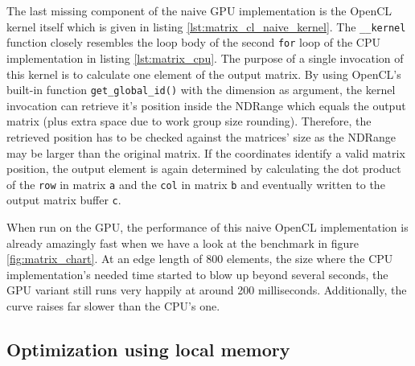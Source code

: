 

The last missing component of the naive GPU implementation is the OpenCL kernel itself which is given in listing \ref{lst:matrix_cl_naive_kernel}. The \lstinline!__kernel! function closely resembles the loop body of the second \lstinline!for! loop of the CPU implementation in listing \ref{lst:matrix_cpu}. The purpose of a single invocation of this kernel is to calculate one element of the output matrix. By using OpenCL's built-in function \lstinline!get_global_id()! with the dimension as argument, the kernel invocation can retrieve it's position inside the NDRange which equals the output matrix (plus extra space due to work group size rounding). Therefore, the retrieved position has to be checked against the matrices' size as the NDRange may be larger than the original matrix. If the coordinates identify a valid matrix position, the output element is again determined by calculating the dot product of the \lstinline!row! in matrix \lstinline!a! and the \lstinline!col! in matrix \lstinline!b! and eventually written to the output matrix buffer \lstinline!c!.



When run on the GPU, the performance of this naive OpenCL implementation is already amazingly fast when we have a look at the benchmark in figure \ref{fig:matrix_chart}. At an edge length of 800 elements, the size where the CPU implementation's needed time started to blow up beyond several seconds, the GPU variant still runs very happily at around 200 milliseconds. Additionally, the curve raises far slower than the CPU's one.


\subsection{Optimization using local memory}






